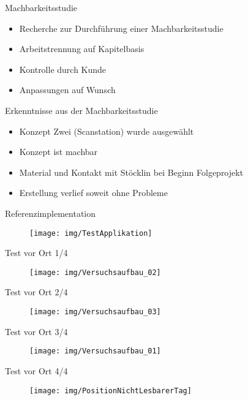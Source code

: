 \documentclass{beamer}
\begin{document}
\begin{frame}{Machbarkeitsstudie}
\begin{itemize}
    \item Recherche zur Durchführung einer Machbarkeitsstudie
    \item Arbeitstrennung auf Kapitelbasis
    \item Kontrolle durch Kunde
    \item Anpassungen auf Wunsch
\end{itemize}
\end{frame}
\begin{frame}{Erkenntnisse aus der Machbarkeitsstudie}
\begin{itemize}
    \item Konzept Zwei (Scanstation) wurde ausgewählt
    \item Konzept ist machbar
    \item Material und Kontakt mit Stöcklin bei Beginn Folgeprojekt
    \item Erstellung verlief soweit ohne Probleme
\end{itemize}
\end{frame}
\begin{frame}{Referenzimplementation}
\begin{figure}[tbh!]
    \centering
    \texttt{[image: img/TestApplikation]}
    \label{fig:testapplikation}
\end{figure}
\end{frame}
\begin{frame}{Test vor Ort 1/4}
\begin{figure}[tbh!]
    \centering
    \texttt{[image: img/Versuchsaufbau\_02]}    \label{fig:versuchsaufbau02}
\end{figure}
\end{frame}
\begin{frame}{Test vor Ort 2/4}
\begin{figure}[tbh!]
    \centering
    \texttt{[image: img/Versuchsaufbau\_03]}    \label{fig:versuchsaufbau03}
\end{figure}
\end{frame}
\begin{frame}{Test vor Ort 3/4}
\begin{figure}[tbh!]
    \centering
    \texttt{[image: img/Versuchsaufbau\_01]}   \label{fig:versuchsaufbau01}
\end{figure}
\end{frame}
\begin{frame}{Test vor Ort 4/4}
\begin{figure}[tbh!]
    \centering
    \texttt{[image: img/PositionNichtLesbarerTag]}   \label{fig:PositionNichtLesbarerTag}
\end{figure}
\end{frame}
\end{document}
